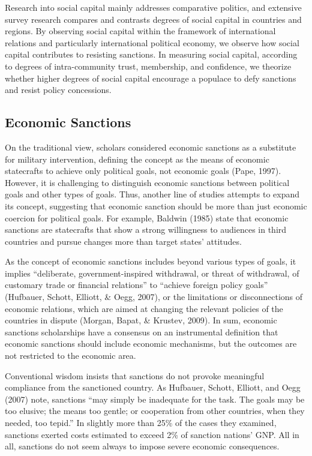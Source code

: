 \documentclass[
  english,
  man]{apa6}
\begin{document}
Research into social capital mainly addresses comparative politics, and extensive survey research compares and contrasts degrees of social capital in countries and regions. By observing social capital within the framework of international relations and particularly international political economy, we observe how social capital contributes to resisting sanctions. In measuring social capital, according to degrees of intra-community trust, membership, and confidence, we theorize whether higher degrees of social capital encourage a populace to defy sanctions and resist policy concessions.

\hypertarget{economic-sanctions}{%
\subsection{Economic Sanctions}\label{economic-sanctions}}

On the traditional view, scholars considered economic sanctions as a substitute for military intervention, defining the concept as the means of economic statecrafts to achieve only political goals, not economic goals (Pape, 1997). However, it is challenging to distinguish economic sanctions between political goals and other types of goals. Thus, another line of studies attempts to expand its concept, suggesting that economic sanction should be more than just economic coercion for political goals. For example, Baldwin (1985) state that economic sanctions are statecrafts that show a strong willingness to audiences in third countries and pursue changes more than target states' attitudes.

As the concept of economic sanctions includes beyond various types of goals, it implies ``deliberate, government-inspired withdrawal, or threat of withdrawal, of customary trade or financial relations'' to ``achieve foreign policy goals'' (Hufbauer, Schott, Elliott, \& Oegg, 2007), or the limitations or disconnections of economic relations, which are aimed at changing the relevant policies of the countries in dispute (Morgan, Bapat, \& Krustev, 2009). In sum, economic sanctions scholarships have a consensus on an instrumental definition that economic sanctions should include economic mechanisms, but the outcomes are not restricted to the economic area.

Conventional wisdom insists that sanctions do not provoke meaningful compliance from the sanctioned country. As Hufbauer, Schott, Elliott, and Oegg (2007) note, sanctions ``may simply be inadequate for the task. The goals may be too elusive; the means too gentle; or cooperation from other countries, when they needed, too tepid.'' In slightly more than 25\% of the cases they examined, sanctions exerted costs estimated to exceed 2\% of sanction nations' GNP. All in all, sanctions do not seem always to impose severe economic consequences.
\end{document}

